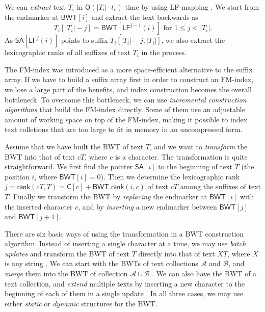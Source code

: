 \documentclass[smallabstract,smallcaptions]{dccpaper}
\newcommand{\abs}[1]{\ensuremath{\lvert #1 \rvert}}
\newcommand{\Oh}{\ensuremath{\mathsf{O}}}
\newcommand{\BWT}{\textsf{BWT}}
\newcommand{\mSA}{\ensuremath{\mathsf{SA}}}
\newcommand{\mBWT}{\ensuremath{\mathsf{BWT}}}
\newcommand{\mC}{\ensuremath{\mathsf{C}}}
\newcommand{\LF}{\textsf{LF}}
\newcommand{\mrank}{\ensuremath{\mathsf{rank}}}
\newcommand{\Acoll}{\ensuremath{\mathcal{A}}}
\newcommand{\Bcoll}{\ensuremath{\mathcal{B}}}
\begin{document}
We can \emph{extract} text $T_{i}$ in $\Oh(\abs{T_{i}} \cdot t_{r})$ time by using \LF\nobreakdash-mapping \cite{Burrows1994}. We start from the endmarker at $\mBWT[i]$ and extract the text backwards as
$$
T_{i}[\abs{T_{i}} - j] = \mBWT[\LF^{j-1}(i)] \,\, \textrm{for} \,\, 1 \le j < \abs{T_{i}}.
$$
As $\mSA[\LF^{j}(i)]$ points to suffix $T_{i}[\abs{T_{i}}-j, \abs{T_{i}}]$, we also extract the lexicographic ranks of all suffixes of text $T_{i}$ in the process.


\Section{Space-efficient \BWT{} construction}

The FM-index was introduced as a more space-efficient alternative to the suffix array. If we have to build a suffix array first in order to construct an FM-index, we lose a large part of the benefits, and index construction becomes the overall bottleneck. To overcome this bottleneck, we can use \emph{incremental construction algorithms} that build the FM-index directly. Some of them use an adjustable amount of working space on top of the FM-index, making it possible to index text colletions that are too large to fit in memory in an uncompressed form.

Assume that we have built the \BWT{} of text $T$, and we want to \emph{transform} the \BWT{} into that of text $cT$, where $c$ is a character. The transformation \cite{Hon2007} is quite straightforward. We first find the pointer $\mSA[i]$ to the beginning of text $T$ (the position $i$, where $\mBWT[i] = 0$). Then we determine the lexicographic rank $j = \mrank(cT, T) = \mC[c] + \mBWT.\mrank(i, c)$ of text $cT$ among the suffixes of text $T$. Finally we transform the \BWT{} by \emph{replacing} the endmarker at $\mBWT[i]$ with the inserted character $c$, and by \emph{inserting} a new endmarker between $\mBWT[j]$ and $\mBWT[j+1]$.

There are six basic ways of using the transformation in a \BWT{} construction algorithm. Instead of inserting a single character at a time, we may use \emph{batch updates} and transform the \BWT{} of text $T$ directly into that of text $XT$, where $X$ is any string \cite{Hon2007}. We can start with the \BWT{}s of text collections $\Acoll$ and $\Bcoll$, and \emph{merge} them into the \BWT{} of collection $\Acoll \cup \Bcoll$ \cite{Siren2009}. We can also have the \BWT{} of a text collection, and \emph{extend} multiple texts by inserting a new character to the beginning of each of them in a single update \cite{Bauer2013}. In all three cases, we may use either \emph{static} or \emph{dynamic} \cite{Chan2007} structures for the \BWT.
\end{document}
